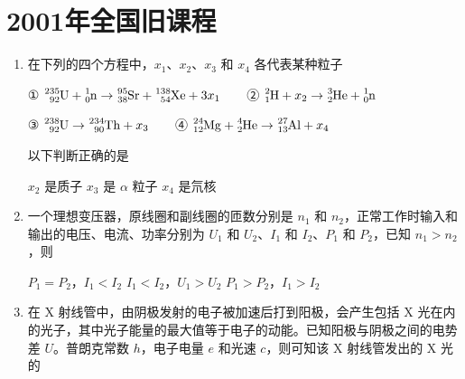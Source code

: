 \documentclass[\gkver]{gaokaozhenti}
\begin{document}
\chapter{2001年全国旧课程}

\begin{enumerate}
\item
在下列的四个方程中，$x_{1}$、$x_{2}$、$x_{3}$ 和 $x_{4}$ 各代表某种粒子

① $\ce{^{235}_{92}U}+\ce{^{1}_{0}n}\to\ce{^{95}_{38}Sr}+\ce{^{138}_{54}Xe}+3x_{1}$　　② $\ce{^{2}_{1}H}+x_{2}\to\ce{^{3}_{2}He}+\ce{^{1}_{0}n}$

③ $\ce{^{238}_{92}U}\to\ce{^{234}_{90}Th}+x_{3}$　　④ $\ce{^{24}_{12}Mg}+\ce{^{4}_{2}He}\to\ce{^{27}_{13}Al}+x_{4}$

以下判断正确的是

{$x_{2}$ 是质子}
{$x_{3}$ 是 $\alpha$ 粒子}
{$x_{4}$ 是氘核}


\item
一个理想变压器，原线圈和副线圈的匝数分别是 $n_{1}$ 和 $n_{2}$，正常工作时输入和输出的电压、电流、功率分别为 $U_{1}$ 和 $U_{2}$、$I_{1}$ 和 $I_{2}$、$P_{1}$ 和 $P_{2}$，已知 $n_{1} > n_{2}$，则

{$P_{1} = P_{2}$，$I_{1} < I_{2}$}
{$I_{1} < I_{2}$，$U_{1} > U_{2}$}
{$P_{1} > P_{2}$，$I_{1} > I_{2}$}


\item
在 X 射线管中，由阴极发射的电子被加速后打到阳极，会产生包括 X 光在内的光子，其中光子能量的最大值等于电子的动能。已知阳极与阴极之间的电势差 $U$。普朗克常数 $h$，电子电量 $e$ 和光速 $c$，则可知该 X 射线管发出的 X 光的


\end{enumerate}
\end{document}
